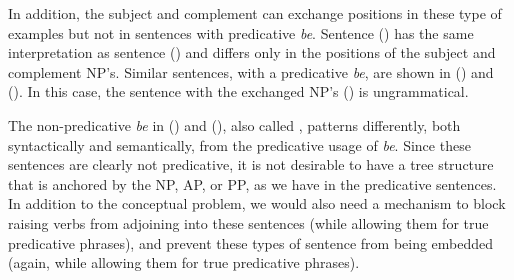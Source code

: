 {



In addition, the subject and complement can exchange positions in these type of
examples but not in sentences with predicative {\it be}.  Sentence ({})
has the same interpretation as sentence ({}) and differs only in the
positions of the subject and complement NP's. Similar sentences, with a
predicative {\it be}, are shown in ({}) and ({}).  In this case,
the sentence with the exchanged NP's ({}) is ungrammatical.


The non-predicative {\it be} in ({}) and ({}), also called
, patterns differently, both syntactically and
semantically, from the predicative usage of {\it be}.  Since these sentences
are clearly not predicative, it is not desirable to have a tree structure that
is anchored by the NP, AP, or PP, as we have in the predicative sentences.  In
addition to the conceptual problem, we would also need a mechanism to block
raising verbs from adjoining into these sentences (while allowing them for true
predicative phrases), and prevent these types of sentence from being embedded
(again, while allowing them for true predicative phrases).  

}
